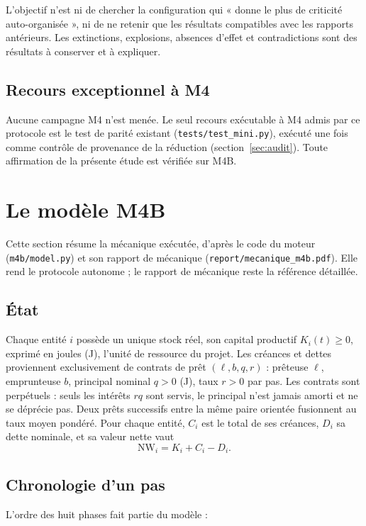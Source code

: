 \documentclass[11pt,a4paper]{article}
\newcommand{\code}[1]{\texttt{#1}}
\newcommand{\NW}{\mathrm{NW}}
\begin{document}
L'objectif n'est ni de chercher la configuration qui « donne le plus de
criticité auto-organisée », ni de ne retenir que les résultats compatibles
avec les rapports antérieurs. Les extinctions, explosions, absences d'effet
et contradictions sont des résultats à conserver et à expliquer.

\subsection{Recours exceptionnel à M4}

Aucune campagne M4 n'est menée. Le seul recours exécutable à M4 admis par
ce protocole est le test de parité existant
(\code{tests/test\_mini.py}), exécuté une fois comme contrôle de provenance
de la réduction (section~\ref{sec:audit}). Toute affirmation de la présente
étude est vérifiée sur M4B.

\section{Le modèle M4B}
\label{sec:modele}

Cette section résume la mécanique exécutée, d'après le code du moteur
(\code{m4b/model.py}) et son rapport de mécanique
(\code{report/mecanique\_m4b.pdf}). Elle rend le protocole autonome ; le
rapport de mécanique reste la référence détaillée.

\subsection{État}

Chaque entité $i$ possède un unique stock réel, son capital productif
$K_i(t)\ge 0$, exprimé en joules (J), l'unité de ressource du projet. Les
créances et dettes proviennent exclusivement de contrats de prêt
$(\ell,b,q,r)$ : prêteuse $\ell$, emprunteuse $b$, principal nominal $q>0$
(J), taux $r>0$ par pas. Les contrats sont perpétuels : seuls les intérêts
$rq$ sont servis, le principal n'est jamais amorti et ne se déprécie pas.
Deux prêts successifs entre la même paire orientée fusionnent au taux moyen
pondéré. Pour chaque entité, $C_i$ est le total de ses créances, $D_i$ sa
dette nominale, et sa valeur nette vaut
\[
\NW_i = K_i + C_i - D_i .
\]

\subsection{Chronologie d'un pas}

L'ordre des huit phases fait partie du modèle :
\end{document}
